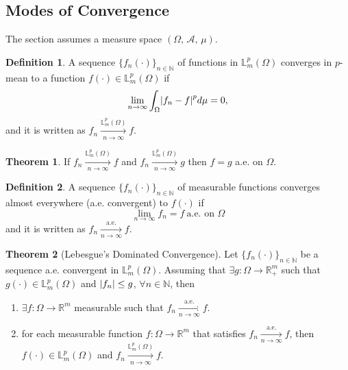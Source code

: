\documentclass[11pt,letterpaper]{article}
\newcommand{\NN}{{\mathbb{N}}}
\newcommand{\LL}{{\mathbb{L}}}
\newcommand{\RR}{{\mathbb{R}}}
\newcommand{\A}{{\mathcal{A}}}
\let\originalleft\left
\let\originalright\right
\renewcommand{\left}{\mathopen{}\mathclose\bgroup\originalleft}
\renewcommand{\right}{\aftergroup\egroup\originalright}
\theoremstyle{definition}
\newtheorem{definition}{Definition}[section]
\newtheorem{theorem}{Theorem}[section]
\begin{document}
\subsection{Modes of Convergence}
The section assumes a measure space $(\Omega,\,\A,\,\mu)$.
\begin{definition}
A sequence $\{f_n(\cdot)\}_{n\in\NN}$ of functions in $\LL_m^p(\Omega)$ converges in $p$-mean to a function $f(\cdot)\in \LL_m^p(\Omega)$ if
\begin{equation}
    \lim_{n\rightarrow\infty}\int_\Omega\left|f_n-f\right|^pd\mu = 0,
\end{equation}
and it is written as $f_n\xrightarrow[n\rightarrow\infty]{\LL_m^p(\Omega)}f$.
\end{definition}
\begin{theorem}
If $f_n\xrightarrow[n\rightarrow\infty]{\LL_m^p(\Omega)}f$ and $f_n\xrightarrow[n\rightarrow\infty]{\LL_m^p(\Omega)}g$ then $f=g$ a.e. on $\Omega$.
\end{theorem}

\begin{definition}
A sequence $\{f_n(\cdot)\}_{n\in\NN}$ of measurable functions converges almost everywhere (a.e. convergent) to $f(\cdot)$ if 
\begin{equation}
    \lim_{n\rightarrow\infty}f_n = f \ \text{a.e. on } \Omega
\end{equation}
and it is written as $f_n\xrightarrow[n\rightarrow\infty]{\text{a.e.}}f$.
\end{definition}

\begin{theorem}[Lebesgue's Dominated Convergence]
Let $\{f_n(\cdot)\}_{n\in\NN}$ be a sequence a.e. convergent in $\LL_m^p(\Omega)$. Assuming that $\exists g:\Omega\rightarrow\RR^m_+$ such that $g(\cdot)\in\LL_m^p(\Omega)$ and $\left|f_n\right|\leq g$, $\forall n\in\NN$, then
\begin{enumerate}
    \item $\exists f:\Omega\rightarrow\RR^m$ measurable such that $f_n\xrightarrow[n\rightarrow\infty]{\text{a.e.}}f$.
    \item for each measurable function $f:\Omega\rightarrow\RR^m$ that satisfies $f_n\xrightarrow[n\rightarrow\infty]{\text{a.e.}}f$, then $f(\cdot)\in\LL_m^p(\Omega)$ and $f_n\xrightarrow[n\rightarrow\infty]{\LL_m^p(\Omega)}f$.
\end{enumerate}
\end{theorem}
\end{document}
